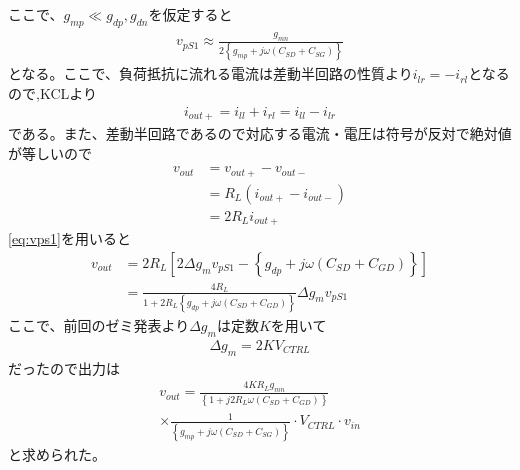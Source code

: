 \documentclass[twocolumn]{jsarticle}
\begin{document}
    ここで、$g_{mp}\ll g_{dp},g_{dn}$を仮定すると
    \begin{align}
        v_{pS1} \approx \frac{g_{mn}}{ 2\left\{ g_{mp}+j\omega(C_{SD}+C_{SG}) \right\} }    \label{eq:vps1}
    \end{align}
    となる。ここで、負荷抵抗に流れる電流は差動半回路の性質より$i_{lr}=-i_{rl}$となるので,KCLより
    \begin{align*}
        i_{out+}=i_{ll}+i_{rl}=i_{ll}-i_{lr}
    \end{align*}
    である。また、差動半回路であるので対応する電流・電圧は符号が反対で絶対値が等しいので
    \begin{align*}
        v_{out} &= v_{out+}-v_{out-}    \\
        &=R_{L}(i_{out+}-i_{out-})      \\
        &= 2R_{L}i_{out+}
    \end{align*}
    \eqref{eq:vps1}を用いると
    \begin{align*}
        v_{out} &= 2R_{L} \left[ 2\Delta g_{m}v_{pS1}- \left\{ g_{dp} + j\omega (C_{SD} + C_{GD}) \right\} \right]    \\
        &= \frac{4R_{L}}{ 1+2R_{L}\left\{ g_{dp} + j\omega(C_{SD}+C_{GD}) \right\} } \Delta g_{m}v_{pS1}
    \end{align*}
    ここで、前回のゼミ発表より$\Delta g_{m}$は定数$K$を用いて
    \begin{align*}
        \Delta g_{m} = 2KV_{CTRL}
    \end{align*}
    だったので出力は
    \begin{multline}
        v_{out} = \frac{4KR_{L}g_{mn}}{ \left\{ 1+j2R_{L}\omega(C_{SD}+C_{GD}) \right\}}\\
        \times\frac{1}{\left\{ g_{mp}+j\omega(C_{SD}+C_{SG}) \right\}}\cdot V_{CTRL}\cdot v_{in}    \label{eq:vout}
    \end{multline}
    と求められた。
\end{document}
